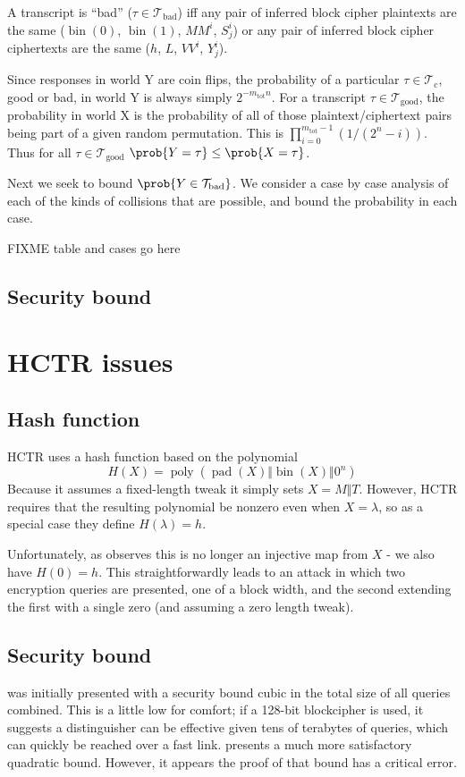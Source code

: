 \documentclass[letterpaper,11pt]{article}
\newcommand*{\Concat}{\Vert}
\newcommand*{\MM}{\mathit{MM}}
\newcommand*{\mtot}{m_{\mathrm{tot}}}
\newcommand*{\Tb}{\mathcal{T}_\mathrm{bad}}
\newcommand*{\Tc}{\mathcal{T}_\mathrm{c}}
\newcommand*{\Tg}{\mathcal{T}_\mathrm{good}}
\newcommand*{\VV}{\mathit{VV}}
\DeclareMathOperator{\fromint}{bin}
\DeclareMathOperator{\pad}{pad}
\DeclareMathOperator{\poly}{poly}
\begin{document}
A transcript is ``bad'' (\(\tau \in \Tb\)) iff any pair of 
inferred block cipher plaintexts are the same
(\(\fromint(0)\), \(\fromint(1)\), \(\MM^i\), \(S_j^i\))
or any pair of inferred block cipher ciphertexts are the same
(\(h\), \(L\), \(\VV^i\), \(Y_j^i\)). 

Since responses in world Y are coin flips,
the probability of a 
particular \(\tau \in \Tc\), good or bad,
in world Y is always simply \(2^{-\mtot n}\).
For a transcript \(\tau \in \Tg\),
the probability in world X
is the probability of all of those plaintext/ciphertext
pairs being part of a given random permutation.
This is 
\(\prod_{i=0}^{\mtot -1}(1/(2^n - i))\).
Thus for all \(\tau \in \Tg\)
\(\prob{Y = \tau} \leq \prob{X = \tau}\). 

Next we seek to bound \(\prob{Y \in \Tb}\).
We consider a case by case analysis of
each of the kinds of collisions that are
possible, and bound the probability in each case.

FIXME table and cases go here

\subsection{Security bound}

\section{HCTR issues}\label{hctrflaws}
\subsection{Hash function}
HCTR uses a hash function based on the polynomial
\begin{displaymath}
    H(X) = \poly(\pad(X) \Concat \fromint(X) \Concat 0^n)
\end{displaymath}
Because it assumes a fixed-length tweak it simply sets \(X = M \Concat T\).
However, HCTR requires that the resulting polynomial be nonzero
even when \(X = \lambda\), so as a special case they define
\(H(\lambda) = h\).

Unfortunately, as \cite{kumarhctr} observes this is no longer
an injective map from \(X\) - we also have \(H(0) = h\). This
straightforwardly leads to an attack in which two encryption queries
are presented, one of a block width, and the second extending
the first with a single zero (and assuming a zero length tweak).

\subsection{Security bound}
\cite{hctr} was initially presented with a security bound cubic
in the total size of all queries combined.  This is a little low
for comfort; if a 128-bit blockcipher is used, it suggests a
distinguisher can be effective given tens of terabytes of queries,
which can quickly be reached over a fast link. 
\cite{hctrquad} presents a much more satisfactory quadratic bound.
However, it appears the proof of that bound has a critical error.
\end{document}
